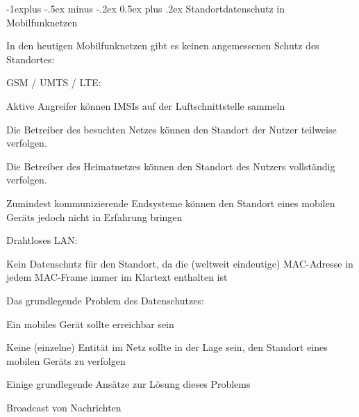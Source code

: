 \documentclass[a4paper]{article}
\makeatletter
\renewcommand{\subsection}{\@startsection{subsection}{2}{0mm}%
 {-1explus -.5ex minus -.2ex}%
 {0.5ex plus .2ex}%
 {\normalfont\normalsize\bfseries}}
\makeatother
\begin{document}
\begin{multicols}{3}
      \subsection{Standortdatenschutz in Mobilfunknetzen}
      \begin{itemize*}
            \item In den heutigen Mobilfunknetzen gibt es keinen angemessenen Schutz des Standortes:
            \begin{itemize*}
                  \item GSM / UMTS / LTE:
                  \begin{itemize*}
                        \item Aktive Angreifer können IMSIs auf der Luftschnittstelle sammeln
                        \item Die Betreiber des besuchten Netzes können den Standort der Nutzer teilweise verfolgen.
                        \item Die Betreiber des Heimatnetzes können den Standort des Nutzers vollständig verfolgen.
                        \item Zumindest kommunizierende Endsysteme können den Standort eines mobilen Geräts jedoch nicht in Erfahrung bringen
                  \end{itemize*}
            \end{itemize*}
            \item Drahtloses LAN:
            \begin{itemize*}
                  \item Kein Datenschutz für den Standort, da die (weltweit eindeutige) MAC-Adresse in jedem MAC-Frame immer im Klartext enthalten ist
            \end{itemize*}
            \item Das grundlegende Problem des Datenschutzes:
            \begin{itemize*}
                  \item Ein mobiles Gerät sollte erreichbar sein
                  \item Keine (einzelne) Entität im Netz sollte in der Lage sein, den Standort eines mobilen Geräts zu verfolgen
            \end{itemize*}
            \item Einige grundlegende Ansätze zur Lösung dieses Problems
            \begin{itemize*}
                  \item Broadcast von Nachrichten

\end{itemize*}
\end{itemize*}
\end{multicols}
\end{document}

